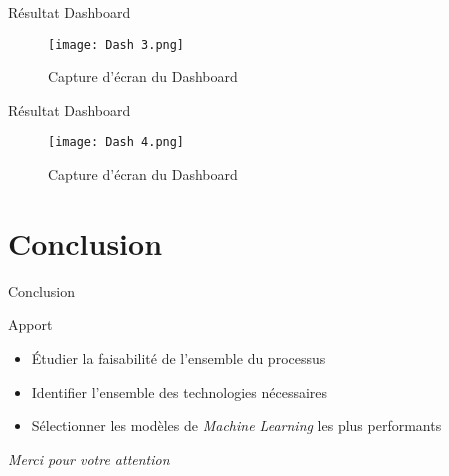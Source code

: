 \documentclass[10pt,sans,usenames,dvipsnames,english,compress]{beamer}
\begin{document}
\begin{frame}{Résultat Dashboard}
    \begin{figure}[!h]
    \centering
    \texttt{[image: Dash 3.png]}
    \caption{Capture d'écran du Dashboard}
    \end{figure}
\end{frame}

\begin{frame}{Résultat Dashboard}
    \begin{figure}[!h]
    \centering
    \texttt{[image: Dash 4.png]}
    \caption{Capture d'écran du Dashboard}
    \end{figure}
\end{frame}

\section{Conclusion}
\begin{frame}{Conclusion}
	\begin{exampleblock}{Apport}
		\begin{itemize}
		\item Étudier la faisabilité de l’ensemble du processus
		\item Identifier l’ensemble des technologies nécessaires
		\item Sélectionner les modèles de \emph{Machine Learning} les plus performants
		\end{itemize}
	\end{exampleblock}

\end{frame}

\begin{frame}{}
  \centering \huge
  \emph{Merci pour votre attention}
\end{frame}
\end{document}
